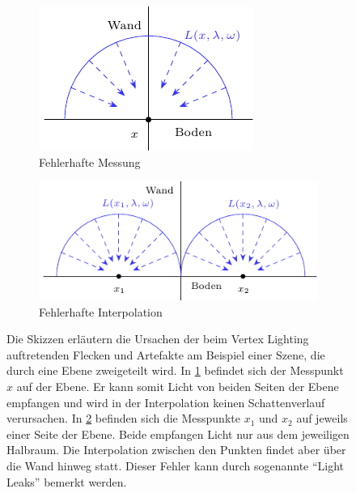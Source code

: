 		\begin{figure}[h]
			\begin{subfigure}[t]{0.4\textwidth}
				\center
				\includegraphics{gg_fig/vertex_lighting-error_1.pdf}
				\caption{Fehlerhafte Messung}
				\label{subfig:vertex-lighting-error-measurement}
			\end{subfigure}
			\begin{subfigure}[t]{0.6\textwidth}
				\center
				\includegraphics{gg_fig/vertex_lighting-error_2.pdf}
				\caption{Fehlerhafte Interpolation}
				\label{subfig:vertex-lighting-error-interpolation}
			\end{subfigure}
			\caption[Fehlerursachen des Vertex Lighting]{Die Skizzen erläutern die Ursachen der beim Vertex Lighting auftretenden Flecken und Artefakte am Beispiel einer Szene, die durch eine Ebene zweigeteilt wird. In \ref{subfig:vertex-lighting-error-measurement} befindet sich der Messpunkt $x$ auf der Ebene. Er kann somit Licht von beiden Seiten der Ebene empfangen und wird in der Interpolation keinen Schattenverlauf verursachen. In \ref{subfig:vertex-lighting-error-interpolation} befinden sich die Messpunkte $x_1$ und $x_2$ auf jeweils einer Seite der Ebene. Beide empfangen Licht nur aus dem jeweiligen Halbraum. Die Interpolation zwischen den Punkten findet aber über die Wand hinweg statt. Dieser Fehler kann durch sogenannte \enquote{Light Leaks} bemerkt werden.}
			\label{fig:vertex-lighting-error}
		\end{figure}

